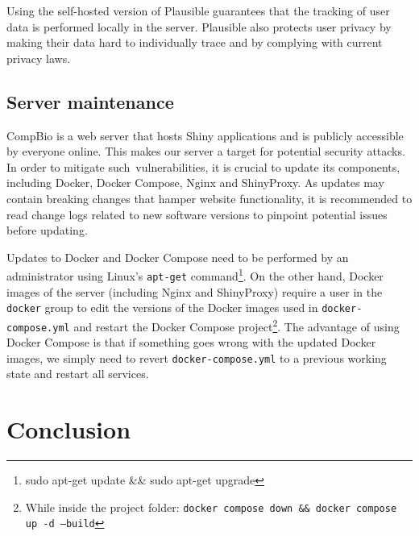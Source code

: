 Using the self-hosted version of Plausible guarantees that the tracking of user data is performed locally in the server. Plausible also protects user privacy by making their data hard to individually trace and by complying with current privacy laws. %

\subsection{Server maintenance}


CompBio is a web server that hosts Shiny applications and is publicly accessible by everyone online. This makes our server a target for potential security attacks. In order to mitigate such vulnerabilities, it is crucial to update its components, including Docker, Docker Compose, Nginx and ShinyProxy. As updates may contain breaking changes that hamper website functionality, it is recommended to read change logs related to new software versions to pinpoint potential issues before updating.


Updates to Docker and Docker Compose need to be performed by an administrator using Linux's \texttt{apt-get} command\footnote{sudo apt-get update \&\& sudo apt-get upgrade}. On the other hand, Docker images of the server (including Nginx and ShinyProxy) require a user in the \texttt{docker} group to edit the versions of the Docker images used in \texttt{docker-compose.yml} and restart the Docker Compose project\footnote{While inside the project folder: \texttt{docker compose down \&\& docker compose up -d --build}}. The advantage of using Docker Compose is that if something goes wrong with the updated Docker images, we simply need to revert \texttt{docker-compose.yml} to a previous working state and restart all services.

\section{Conclusion}


